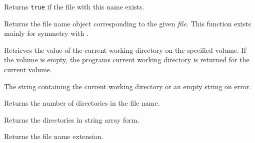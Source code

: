 \label{wxfilenamefileexists}



Returns {\tt true} if the file with this name exists.





\label{wxfilenamefilename}


Returns the file name object corresponding to the given {\it file}. This
function exists mainly for symmetry with .



\label{wxfilenamegetcwd}


Retrieves the value of the current working directory on the specified volume. If
the volume is empty, the programs current working directory is returned for the
current volume.


The string containing the current working directory or an empty string on
error.




\label{wxfilenamegetdircount}


Returns the number of directories in the file name.


\label{wxfilenamegetdirs}


Returns the directories in string array form.


\label{wxfilenamegetext}


Returns the file name extension.


